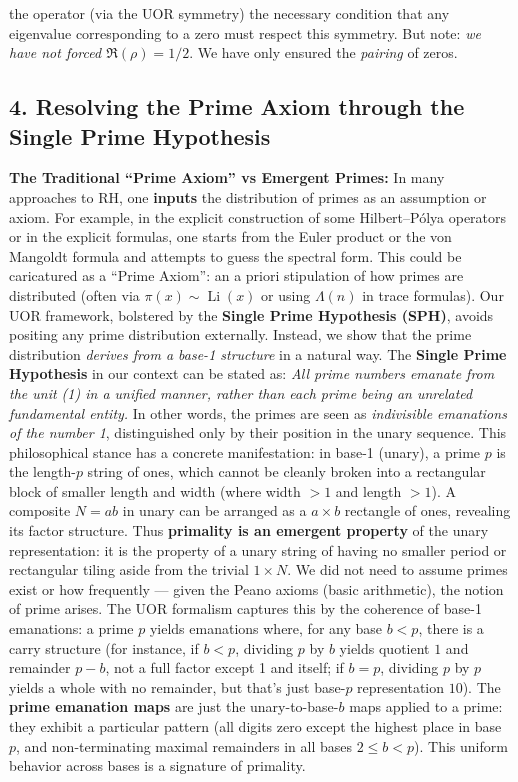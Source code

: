 \documentclass{article}
\begin{document}
the operator (via the UOR symmetry) the necessary condition that any eigenvalue corresponding to a zero must respect this symmetry. But note: \emph{we have not forced $\Re(\rho)=1/2$}. We have only ensured the \emph{pairing} of zeros.

\subsection*{4. Resolving the Prime Axiom through the Single Prime Hypothesis}

\textbf{The Traditional ``Prime Axiom'' vs Emergent Primes:} In many approaches to RH, one \textbf{inputs} the distribution of primes as an assumption or axiom. For example, in the explicit construction of some Hilbert--P\'olya operators or in the explicit formulas, one starts from the Euler product or the von Mangoldt formula and attempts to guess the spectral form. This could be caricatured as a ``Prime Axiom'': an a priori stipulation of how primes are distributed (often via $\pi(x) \sim \operatorname{Li}(x)$ or using $\Lambda(n)$ in trace formulas). Our UOR framework, bolstered by the \textbf{Single Prime Hypothesis (SPH)}, avoids positing any prime distribution externally. Instead, we show that the prime distribution \emph{derives from a base-1 structure} in a natural way. The \textbf{Single Prime Hypothesis} in our context can be stated as: \emph{All prime numbers emanate from the unit (1) in a unified manner, rather than each prime being an unrelated fundamental entity.} In other words, the primes are seen as \emph{indivisible emanations of the number 1}, distinguished only by their position in the unary sequence. This philosophical stance has a concrete manifestation: in base-1 (unary), a prime $p$ is the length-$p$ string of ones, which cannot be cleanly broken into a rectangular block of smaller length and width (where width $>1$ and length $>1$). A composite $N=ab$ in unary can be arranged as a $a \times b$ rectangle of ones, revealing its factor structure. Thus \textbf{primality is an emergent property} of the unary representation: it is the property of a unary string of having no smaller period or rectangular tiling aside from the trivial $1\times N$. We did not need to assume primes exist or how frequently --- given the Peano axioms (basic arithmetic), the notion of prime arises. The UOR formalism captures this by the coherence of base-1 emanations: a prime $p$ yields emanations where, for any base $b<p$, there is a carry structure (for instance, if $b<p$, dividing $p$ by $b$ yields quotient $1$ and remainder $p-b$, not a full factor except 1 and itself; if $b=p$, dividing $p$ by $p$ yields a whole with no remainder, but that's just base-$p$ representation $10$). The \textbf{prime emanation maps} are just the unary-to-base-$b$ maps applied to a prime: they exhibit a particular pattern (all digits zero except the highest place in base $p$, and non-terminating maximal remainders in all bases $2\le b <p$). This uniform behavior across bases is a signature of primality.
\end{document}
